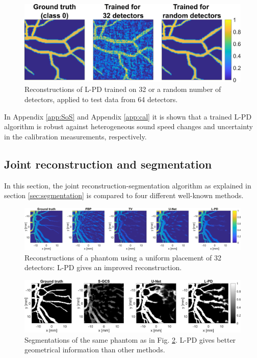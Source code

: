 \documentclass[journal]{IEEEtran}
\begin{document}
\begin{figure}[ht!]
\centering
\includegraphics[width=\linewidth]{images/system_changes_im.png}
\caption{Reconstructions of L-PD trained on 32 or a random number of detectors, applied to test data from 64 detectors.}
\label{fig:system_changes_result}
\end{figure}

In Appendix \ref{app:SoS} and Appendix \ref{app:cal} it is shown that a trained L-PD algorithm is robust against heterogeneous sound speed changes and uncertainty in the calibration measurements, respectively.
\vspace{-1.5mm}
\subsection{Joint reconstruction and segmentation}
In this section, the joint reconstruction-segmentation algorithm as explained in section \ref{sec:segmentation} is compared to four different well-known methods.

\begin{figure}[ht!]
\centering
\includegraphics[width=\linewidth]{images/paper_synthetic_recon.png}
\caption{Reconstructions of a phantom using a uniform placement of 32 detectors: L-PD gives an improved reconstruction.}
\label{fig:synth_recon}
\end{figure}

{
\begin{figure}[ht!]
\centering
\includegraphics[width=0.8\linewidth]{images/paper_synthetic_segm.png}
\caption{Segmentations of the same phantom as in Fig. \ref{fig:synth_recon}. L-PD gives better geometrical information than other methods.}
\label{fig:synth_segm}
\end{figure}
}
\end{document}
